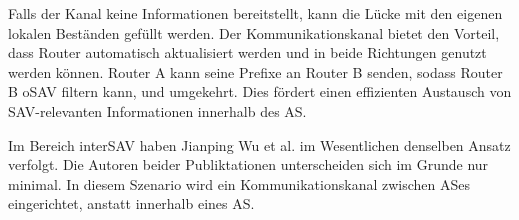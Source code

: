 \documentclass[sigplan,screen]{acmart}
\begin{document}
Falls der Kanal keine Informationen bereitstellt, kann die Lücke mit den eigenen lokalen Beständen gefüllt werden. Der Kommunikationskanal bietet den Vorteil, dass Router automatisch aktualisiert werden und in beide Richtungen genutzt werden können. Router A kann seine Prefixe an Router B senden, sodass Router B oSAV filtern kann, und umgekehrt. Dies fördert einen effizienten Austausch von SAV-relevanten Informationen innerhalb des AS.

Im Bereich interSAV haben Jianping Wu et al. \cite{interSAVNET01} im Wesentlichen denselben Ansatz verfolgt. Die Autoren beider Publiktationen unterscheiden sich im Grunde nur minimal. In diesem Szenario wird ein Kommunikationskanal zwischen ASes eingerichtet, anstatt innerhalb eines AS.




\appendix
\end{document}
